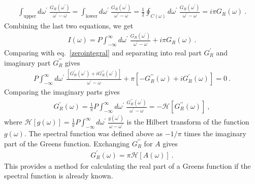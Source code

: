 \documentclass[reprint,hidelinks,onecolumn]{revtex4-2}
\begin{document}
\begin{equation}\begin{aligned}
	\int_\text{upper} d\omega^\prime~\frac{G_R(\omega^\prime)}{\omega^\prime - \omega} = \int_\text{lower} d\omega^\prime~\frac{G_R(\omega^\prime)}{\omega^\prime - \omega} = \frac{1}{2}\oint_{C(\omega)} d\omega^\prime~\frac{G_R(\omega^\prime)}{\omega^\prime - \omega} = i\pi G_R(\omega)~.
\end{aligned}\end{equation}
Combining the last two equations, we get
\begin{equation}\begin{aligned}
	I(\omega) = P\int_{-\infty}^{\infty}d\omega^\prime~\frac{G_R(\omega^\prime)}{\omega^\prime - \omega} + i\pi G_R(\omega)~.
\end{aligned}\end{equation}
Comparing with eq.~\ref{zerointegral} and separating into real part \(G_R^\prime\) and imaginary part \(G_R^{\prime\prime}\) gives
\begin{equation}\begin{aligned}
	P\int_{-\infty}^{\infty}d\omega^\prime~\frac{\left[G_R^\prime(\omega^\prime) + i G_R^{\prime\prime}(\omega^\prime)\right]}{\omega^\prime - \omega} + \pi\left[-G_R^{\prime\prime}(\omega) + i G_R^\prime(\omega) \right]= 0~.
\end{aligned}\end{equation}
Comparing the imaginary parts gives
\begin{equation}\begin{aligned}
	G_R^\prime(\omega) = \frac{1}{\pi}P\int_{-\infty}^{\infty}d\omega^\prime~\frac{G_R^{\prime\prime}(\omega^\prime)}{\omega^\prime - \omega} = - \mathcal{H}\left[G_R^{\prime\prime}(\omega)\right] ~,
\end{aligned}\end{equation}
where \(\mathcal{H}\left[g(\omega)\right]=\frac{1}{\pi}P\int_{-\infty}^{\infty}d\omega^\prime~\frac{g(\omega^\prime)}{\omega - \omega^\prime}\) is the Hilbert transform of the function \(g(\omega)\). The spectral function was defined above as \(-1/\pi\) times the imaginary part of the Greens function. Exchanging \(G_R^{\prime\prime}\) for \(A\) gives
\begin{equation}\begin{aligned}
	G_R^\prime(\omega) = \pi \mathcal{H}\left[A(\omega)\right]~.
\end{aligned}\end{equation}
This provides a method for calculating the real part of a Greens function if the spectral function is already known.
\end{document}
